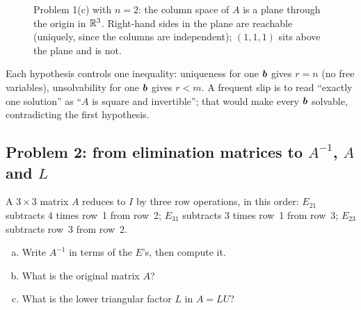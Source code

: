 \begin{figure}[ht]
  \centering
  \caption{Problem 1(c) with $n=2$: the column space of $A$ is a plane through the origin in $\mathbb{R}^3$.
  Right-hand sides in the plane are reachable (uniquely, since the columns are independent);
  $(1,1,1)$ sits above the plane and is not.}
  \label{fig:u15-p1}
\end{figure}

\begin{trap}
Each hypothesis controls one inequality: uniqueness for one $\boldsymbol{b}$ gives $r=n$ (no free
variables), unsolvability for one $\boldsymbol{b}$ gives $r<m$. A frequent slip is to read ``exactly
one solution'' as ``$A$ is square and invertible''; that would make every $\boldsymbol{b}$ solvable,
contradicting the first hypothesis.
\end{trap}

\subsection{Problem 2: from elimination matrices to \texorpdfstring{$A^{-1}$}{A inverse}, \texorpdfstring{$A$}{A} and \texorpdfstring{$L$}{L}}

\begin{exercise}\label{ex:u15-p2}
A $3\times 3$ matrix $A$ reduces to $I$ by three row operations, in this order:
$E_{21}$ subtracts $4$ times row~1 from row~2; $E_{31}$ subtracts $3$ times row~1 from
row~3; $E_{23}$ subtracts row~3 from row~2.
\begin{enumerate}[(a)]
  \item Write $A^{-1}$ in terms of the $E$'s, then compute it.
  \item What is the original matrix $A$?
  \item What is the lower triangular factor $L$ in $A=LU$?
\end{enumerate}
\end{exercise}

